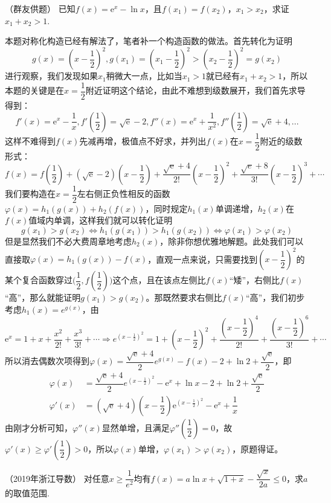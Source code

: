 \begin{example}{（群友供题）}{}
    已知$f(x)=\text{e}^x-\ln x$，且$f(x_1)=f(x_2)$，$x_1>x_2$，求证$x_1+x_2>1$.
\end{example}
\begin{solution}
    本题对称化构造已经有解法了，笔者补一个构造函数的做法。首先转化为证明\[g(x)=(x-\dfrac12)^2,g(x_1)=(x_1-\dfrac12)^2>(x_2-\dfrac12)^2=g(x_2)\]进行观察，我们发现如果$x_1$稍微大一点，比如当$x_1>1$就已经有$x_1+x_2>1$，所以本题的关键是在$x=\dfrac12$附近证明这个结论，由此不难想到级数展开，我们首先求导得到：\vspace{-5pt}
    \[f'(x)=\text{e}^x-\dfrac{1}{x},f'(\dfrac12)=\sqrt{\text{e}}-2,f''(x)=\text{e}^x+\dfrac{1}{x^2},f''(\dfrac12)=\sqrt{\text{e}}+4,...\]
    这样不难得到$f(x)$先减再增，极值点不好求，并列出$f(x)$在$x=\dfrac12$附近的级数形式：
    \[f(x)=f(\dfrac12)+(\sqrt{\text{e}}-2)(x-\dfrac12)+\dfrac{\sqrt{\text{e}}+4}{2!}(x-\dfrac12)^2+\dfrac{\sqrt{e}+8}{3!}(x-\dfrac12)^3+\cdots\]
    我们要构造在$x=\dfrac12$左右侧正负性相反的函数$\varphi(x)=h_1(g(x))+h_2(f(x))$，同时规定$h_1(x)$单调递增，$h_2(x)$在$f(x)$值域内单调，这样我们就可以转化证明
    \[g(x_1)>g(x_2)\Leftrightarrow h_1(g(x_1))>h_1(g(x_2))\Leftrightarrow  \varphi(x_1)>\varphi(x_2)\]
    但是显然我们不必大费周章地考虑$h_2(x)$，除非你想优雅地解题。此处我们可以直接取$\varphi(x)=h_1(g(x))-f(x)$，直观一点来说，只需要找到$(x-\dfrac12)^2$的某个复合函数穿过$\bigg(\dfrac12,f(\dfrac12)\bigg)$这个点，且在该点左侧比$f(x)$“矮”，右侧比$f(x)$“高”，那么就能证明$g(x_1)>g(x_2)$。那既然要求右侧比$f(x)$“高”，我们初步考虑$h_1(x)=e^{g(x)}$，由
    \[\text{e}^x=1+x+\dfrac{x^2}{2!}+\dfrac{x^3}{3!}+\cdots\Rightarrow e^{(x-\frac12)^2}=1+(x-\dfrac12)^2+\dfrac{(x-\dfrac12)^4}{2!}+\dfrac{(x-\dfrac12)^6}{3!}+\cdots\]
    所以消去偶数次项得到$\varphi(x)=\dfrac{\sqrt{\text{e}}+4}{2}e^{g(x)}-f(x)-2+\ln 2+\dfrac{\sqrt{\text{e}}}{2}$，即
    \begin{align*}
        \varphi(x)&=\dfrac{\sqrt{\text{e}}+4}{2}e^{(x-\frac12)^2}-\text{e}^x+\ln x-2+\ln 2+\dfrac{\sqrt{\text{e}}}{2}\\
        \varphi'(x)&=(\sqrt{\text{e}}+4)(x-\dfrac12)\text{e}^{(x-\frac12)^2}-\text{e}^x+\dfrac1{x}
    \end{align*}
    由刚才分析可知，$\varphi''(x)$显然单增，且满足$\varphi''(\dfrac12)=0$，故$\varphi'(x)\geq\varphi'(\dfrac12)>0$，所以$\varphi(x)$单增，$\varphi(x_1)>\varphi(x_2)$，原题得证。
\end{solution}
\newpage
\begin{example}{（2019年浙江导数）}{}
    对任意$x\geq \dfrac{1}{e^2}$均有$f(x)=a\ln x+\sqrt{1+x}-\dfrac{\sqrt{x}}{2a}\leq 0$，求$a$的取值范围.
\end{example}
